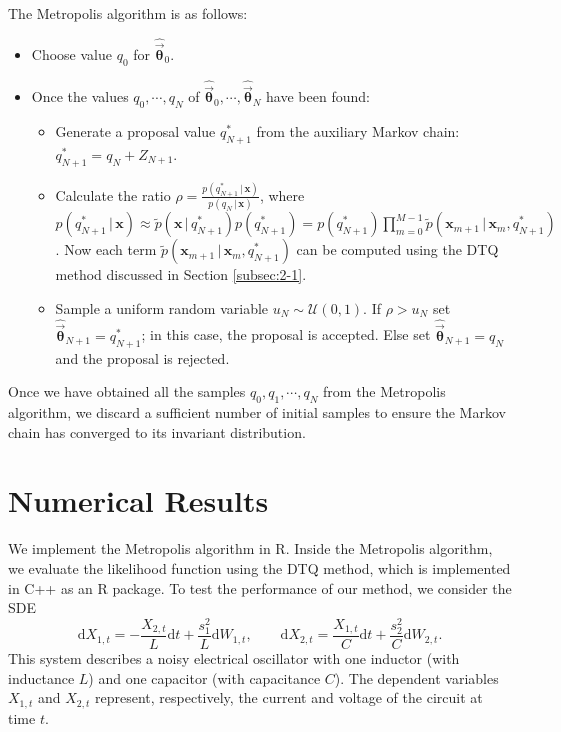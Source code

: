 \documentclass[graybox]{svmult}
\newcommand{\btheta}{\ensuremath{\boldsymbol{\theta}}}
\begin{document}
The Metropolis algorithm is as follows:
\begin{itemize}
\item Choose value $q_0$ for $\hat{\vec{\btheta}}_{0}$.
\item Once the values $q_0, \cdots, q_N$ of $\hat{\vec{\btheta}}_{0},\cdots,\hat{\vec{\btheta}}_{N}$ have been found:
\begin{itemize}
\item Generate a proposal value $q_{N+1}^{*}$ from the auxiliary Markov chain:
$q_{N+1}^{*} = q_{N} + Z_{N+1}$.
\item Calculate the ratio $\rho = \frac{p(q_{N+1}^{*}  \, | \, \mathbf{x})}{p(q_N \, | \, \mathbf{x})}$, where $p(q_{N+1}^{*}  \, | \, \mathbf{x}) \approx \widetilde{p}(\mathbf{x} \, | \, q_{N+1}^{*}) p(q_{N+1}^{*}) = p(q_{N+1}^{*}) \prod_{m=0}^{M-1} \widetilde{p}(\mathbf{x}_{m+1} \, | \, \mathbf{x}_m, q_{N+1}^{*})$. Now each term $\widetilde{p}(\mathbf{x}_{m+1} \, | \, \mathbf{x}_m, q_{N+1}^{*})$ can be computed using the DTQ method
discussed in Section \ref{subsec:2-1}.
\item Sample a uniform random variable $u_N \sim \mathcal{U}(0,1)$.  If $\rho > u_N$ set $\hat{\vec{\btheta}}_{N+1} = q_{N+1}^{*}$; in this case, the proposal is accepted. Else set $\hat{\vec{\btheta}}_{N+1} = q_{N}$ and the proposal is rejected.
\end{itemize}
\end{itemize}
Once we have obtained all the samples $q_0, q_1, \cdots, q_N$ from the Metropolis algorithm, we discard a sufficient number of initial samples to ensure the Markov chain has converged to its invariant distribution.

\section{Numerical Results}
\label{sec:3}
We implement the Metropolis algorithm in R. Inside the Metropolis algorithm, we evaluate the  likelihood function using the DTQ method, which is implemented in C++ as an R package. To test the performance of our method, we consider the SDE
\begin{equation}
\label{eqn:sdeapplication}
\mathrm{d}X_{1,t} =  -\frac{X_{2,t}}{L}\mathrm{d}t + \frac{s_1^2}{L} \mathrm{d}W_{1,t}, \qquad
\mathrm{d}X_{2,t} = \frac{X_{1,t}}{C}\mathrm{d}t + \frac{s_2^2}{C} \mathrm{d}W_{2,t}.
\end{equation}
This system describes a noisy electrical oscillator with one inductor (with inductance $L$) and one capacitor (with capacitance $C$).  The dependent variables $X_{1,t}$ and $X_{2,t}$ represent, respectively, the current and voltage of the circuit at time $t$.
\end{document}
